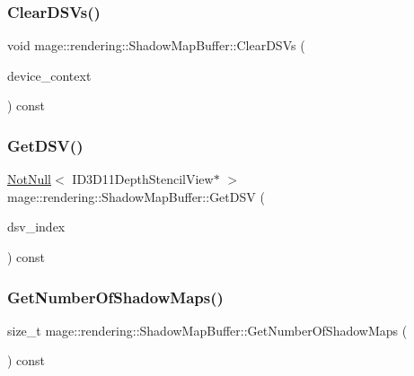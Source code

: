 \subsubsection{\texorpdfstring{Clear\+D\+S\+Vs()}{ClearDSVs()}}
{\footnotesize\ttfamily void mage\+::rendering\+::\+Shadow\+Map\+Buffer\+::\+Clear\+D\+S\+Vs (\begin{DoxyParamCaption}\item[{I\+D3\+D11\+Device\+Context \&}]{device\+\_\+context }\end{DoxyParamCaption}) const\hspace{0.3cm}{\ttfamily [noexcept]}}

\hypertarget{classmage_1_1rendering_1_1_shadow_map_buffer_a3346e66be565ba827d5b4c9b905c4db0}{}\label{classmage_1_1rendering_1_1_shadow_map_buffer_a3346e66be565ba827d5b4c9b905c4db0} 
\subsubsection{\texorpdfstring{Get\+D\+S\+V()}{GetDSV()}}
{\footnotesize\ttfamily \hyperlink{namespacemage_a8769f9d670d6b585ea306cb1062af94b}{Not\+Null}$<$ I\+D3\+D11\+Depth\+Stencil\+View$\ast$ $>$ mage\+::rendering\+::\+Shadow\+Map\+Buffer\+::\+Get\+D\+SV (\begin{DoxyParamCaption}\item[{size\+\_\+t}]{dsv\+\_\+index }\end{DoxyParamCaption}) const\hspace{0.3cm}{\ttfamily [noexcept]}}

\hypertarget{classmage_1_1rendering_1_1_shadow_map_buffer_ac0fe3de2d5a4bf147ac2aad969a234aa}{}\label{classmage_1_1rendering_1_1_shadow_map_buffer_ac0fe3de2d5a4bf147ac2aad969a234aa} 
\subsubsection{\texorpdfstring{Get\+Number\+Of\+Shadow\+Maps()}{GetNumberOfShadowMaps()}}
{\footnotesize\ttfamily size\+\_\+t mage\+::rendering\+::\+Shadow\+Map\+Buffer\+::\+Get\+Number\+Of\+Shadow\+Maps (\begin{DoxyParamCaption}{ }\end{DoxyParamCaption}) const\hspace{0.3cm}{\ttfamily [noexcept]}}

